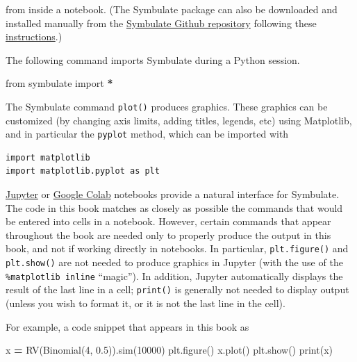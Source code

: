\documentclass[
]{book}
\newenvironment{Shaded}{\begin{snugshade}}{\end{snugshade}}
\newcommand{\BuiltInTok}[1]{#1}
\newcommand{\DecValTok}[1]{\textcolor[rgb]{0.00,0.00,0.81}{#1}}
\newcommand{\FloatTok}[1]{\textcolor[rgb]{0.00,0.00,0.81}{#1}}
\newcommand{\ImportTok}[1]{#1}
\newcommand{\NormalTok}[1]{#1}
\newcommand{\OperatorTok}[1]{\textcolor[rgb]{0.81,0.36,0.00}{\textbf{#1}}}
\theoremstyle{definition}
\theoremstyle{definition}
\theoremstyle{definition}
\theoremstyle{remark}
\begin{document}
from inside a notebook. (The Symbulate package can also be downloaded and installed manually from the \href{/href\%7Bhttps://github.com/dlsun/symbulate\%7D}{Symbulate Github repository} following these \href{https://web.calpoly.edu/~dsun09/python.html}{instructions}.)

The following command imports Symbulate during a Python session.

\begin{Shaded}
\begin{Highlighting}[]
\ImportTok{from}\NormalTok{ symbulate }\ImportTok{import} \OperatorTok{*}
\end{Highlighting}
\end{Shaded}

The Symbulate command \texttt{plot()} produces graphics. These graphics can be customized (by changing axis limits, adding titles, legends, etc) using Matplotlib, and in particular the \texttt{pyplot} method, which can be imported with

\begin{verbatim}
import matplotlib
import matplotlib.pyplot as plt
\end{verbatim}

\href{http://jupyter.org/}{Jupyter} or \href{https://colab.research.google.com/notebooks/intro.ipynb\#}{Google Colab} notebooks provide a natural interface for Symbulate. The code in this book matches as closely as possible the commands that would be entered into cells in a notebook. However, certain commands that appear throughout the book are needed only to properly produce the output in this book, and not if working directly in notebooks. In particular, \texttt{plt.figure()} and \texttt{plt.show()} are not needed to produce graphics in Jupyter (with the use of the \texttt{\%matplotlib\ inline} ``magic''). In addition, Jupyter automatically displays the result of the last line in a cell; \texttt{print()} is generally not needed to display output (unless you wish to format it, or it is not the last line in the cell).

For example, a code snippet that appears in this book as

\begin{Shaded}
\begin{Highlighting}[]
\NormalTok{x }\OperatorTok{=}\NormalTok{ RV(Binomial(}\DecValTok{4}\NormalTok{, }\FloatTok{0.5}\NormalTok{)).sim(}\DecValTok{10000}\NormalTok{)}
\NormalTok{plt.figure()}
\NormalTok{x.plot()}
\NormalTok{plt.show()}
\BuiltInTok{print}\NormalTok{(x)}
\end{Highlighting}
\end{Shaded}
\end{document}
